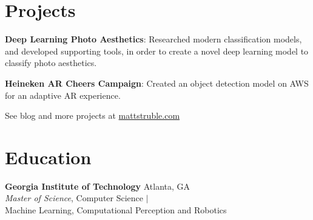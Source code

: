 \documentclass[margin]{res}
\begin{document}
\begin{resume}
\section{Projects} 
\phantom{spacing}
\par
\textbf{Deep Learning Photo Aesthetics}: 
Researched modern classification models, and developed supporting tools, in order to create a novel deep learning model to classify photo aesthetics. 

\par
\textbf{Heineken\textsuperscript{\textregistered} AR Cheers Campaign}: 
Created an object detection model on AWS for an adaptive AR experience.


\hfill See blog and more projects at \href{http://mattstruble.com}{mattstruble.com}





\section{Education}
\phantom{spacing}
\par
\textbf{Georgia Institute of Technology} \hfill Atlanta, GA\\
{\sl Master of Science}, Computer Science $\vert$ \\
Machine Learning, Computational Perception and Robotics


\end{resume}
\end{document}
